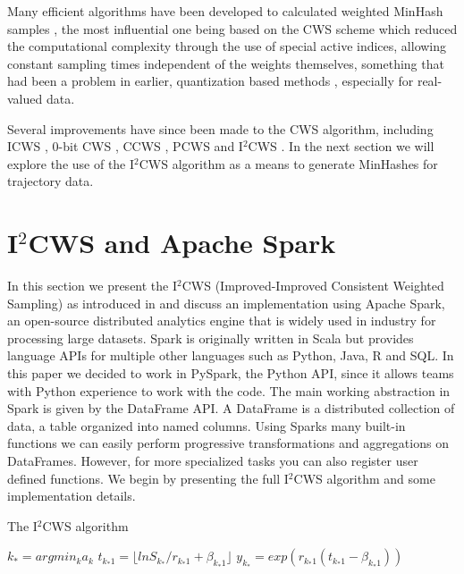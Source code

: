 \documentclass[../main.tex]{subfiles}
\begin{document}
Many efficient algorithms have been developed to calculated weighted MinHash samples \cite{wu2020review}, the most influential one being based on the CWS scheme \cite{manasse2010consistent} which reduced the computational complexity through the use of special active indices, allowing constant sampling times independent of the weights themselves, something that had been a problem in earlier, quantization based methods \cite{gollapudi2006exploiting}, especially for real-valued data. 

Several improvements have since been made to the CWS algorithm, including ICWS \cite{ioffe2010improved}, 0-bit CWS \cite{li20150}, CCWS \cite{wu2016canonical}, PCWS \cite{wu2017consistent} and I$^2$CWS \cite{wu2018improved}. In the next section we will explore the use of the I$^2$CWS algorithm as a means to generate MinHashes for trajectory data.

\newpage

\section{I$^2$CWS and Apache Spark}
In this section we present the I$^2$CWS (Improved-Improved Consistent Weighted Sampling) as introduced in \cite{wu2018improved} and discuss an implementation using Apache Spark, an open-source distributed analytics engine that is widely used in industry for processing large datasets.
Spark is originally written in Scala but provides language APIs for multiple other languages such as Python, Java, R and SQL. In this paper we decided to work in PySpark, the Python API, since it allows teams with Python experience to work with the code. The main working abstraction in Spark is given by the DataFrame API. A DataFrame is a distributed collection of data, a table organized into named columns.
Using Sparks many built-in functions we can easily perform progressive transformations and aggregations on DataFrames. However, for more specialized tasks you can also register user defined functions. We begin by presenting the full I$^2$CWS algorithm and some implementation details.

\begin{algorithm}
\DontPrintSemicolon
{}
\caption{The I$^2$CWS algorithm \cite{wu2018improved}}
\label{alg:1}
$k_* = argmin_ka_k$\;
$t_{k_*1} = \lfloor ln S_{k_*} / r_{k_*1} + \beta_{k_*1}\rfloor$\;
$y_{k_*} = exp(r_{k_*1}(t_{k_*1} - \beta_{k_*1}))$\;
\end{algorithm}
\end{document}
